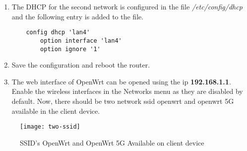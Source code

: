 \begin{enumerate}
\begin{lstlisting}
	config interface 'wifi'
	option type 'bridge'
	option ifname 'eth0.3'
	option proto 'static'
	option ipaddr '192.168.3.1'
	option netmask '255.255.255.0'
	option ip6assign '60'
	
	config interface 'lan3'
	option ifname 'eth0.3'
	
	config interface 'lan4'
	option ifname 'eth0.4'
	
	config interface 'lan5'
	option ifname 'eth0.5'
	
	config switch
	option name 'switch0'
	option reset '1'
	option enable_vlan '1'
	
	config switch_vlan
	option device 'switch0'
	option vlan '1'
	option ports '1 0t'
	option vid '1'
	
	config switch_vlan
	option device 'switch0'
	option vlan '2'
	option ports '2 0t'
	option ipaddr '192.168.3.1'
	option netmask '255.255.255.0'
	option ip6assign '60'
	
	config interface 'lan3'
	option ifname 'eth0.3'
	
	config interface 'lan4'
	option ifname 'eth0.4'
	
	config interface 'lan5'
	option ifname 'eth0.5'
	
	config switch
	option name 'switch0'
	option reset '1'
	option enable_vlan '1'
	
	config switch_vlan
	option device 'switch0'
	option vlan '1'
	option ports '1 0t'
	option vid '1'
	
	config switch_vlan
	option device 'switch0'
	option vlan '2'
	option ports '2 0t'
	option vid '2'
	
	config switch_vlan
	option device 'switch0'
	option vlan '3'
	option ports '3 0t'
	option vid '3'
	
	config switch_vlan
	option device 'switch0'
	option vlan '4'
	option vid '4'
	option ports '0t 4'
	
	config switch_vlan
	option device 'switch0'
	option vlan '5'
	option vid '5'
	option ports '0t 5'
	\end{lstlisting}
	\item The DHCP for the second network is configured in the file \textit{/etc/config/dhcp} and the following entry is added to the file.
	\begin{lstlisting}
	config dhcp 'lan4'
		option interface 'lan4'
		option ignore '1'
	\end{lstlisting}
	\item Save the configuration and reboot the router.
	\item The web interface of OpenWrt can be opened using the ip \textbf{192.168.1.1}. Enable the wireless interfaces in the Networks menu as they are disabled by default. Now, there should be two network ssid openwrt and openwrt 5G available in the client device.
	
\end{enumerate}
  \begin{figure}[H]
	\centering
	\texttt{[image: two-ssid]}
	\caption {SSID's OpenWrt and OpenWrt 5G Available on client device}
	\label{fig:two-ssid}
	\vspace{-10pt}
\end{figure}
